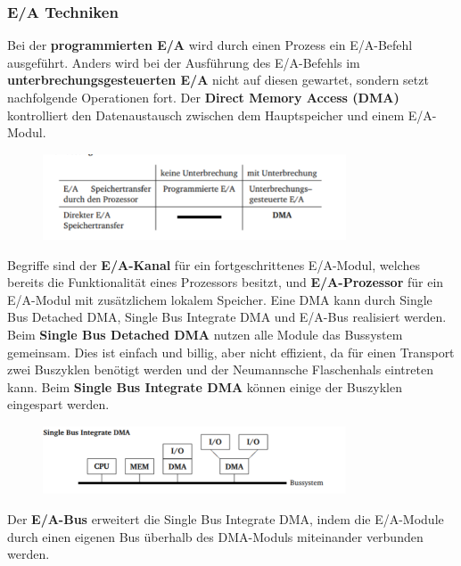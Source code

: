 \documentclass{article}
\begin{document}
\subsubsection{E/A Techniken}
    Bei der \textbf{programmierten E/A} wird durch einen Prozess ein E/A-Befehl ausgeführt. Anders wird bei der Ausführung des E/A-Befehls im \textbf{unterbrechungsgesteuerten E/A} nicht auf diesen gewartet, sondern setzt nachfolgende Operationen fort. Der \textbf{Direct Memory Access (DMA)} kontrolliert den Datenaustausch zwischen dem Hauptspeicher und einem E/A-Modul.
    \begin{figure}[H]
        \centering
	    \includegraphics[width=90mm]{Skizzen/3_Kapitel/zusammenfassung_ea.png}
    \end{figure}
    Begriffe sind der \textbf{E/A-Kanal} für ein fortgeschrittenes E/A-Modul, welches bereits die Funktionalität eines Prozessors besitzt, und \textbf{E/A-Prozessor} für ein E/A-Modul mit zusätzlichem lokalem Speicher.\newline
    Eine DMA kann durch Single Bus Detached DMA, Single Bus Integrate DMA und E/A-Bus realisiert werden.\newline
    Beim \textbf{Single Bus Detached DMA} nutzen alle Module das Bussystem gemeinsam. Dies ist einfach und billig, aber nicht effizient, da für einen Transport zwei Buszyklen benötigt werden und der Neumannsche Flaschenhals eintreten kann.\newline
    Beim \textbf{Single Bus Integrate DMA} können einige der Buszyklen eingespart werden.
    \begin{figure}[H]
        \centering
	    \includegraphics[width=90mm]{Skizzen/3_Kapitel/single_bus_integrate_dma.png}
    \end{figure}\newline
    Der \textbf{E/A-Bus} erweitert die Single Bus Integrate DMA, indem die E/A-Module durch einen eigenen Bus überhalb des DMA-Moduls miteinander verbunden werden. 
    
\end{document}
